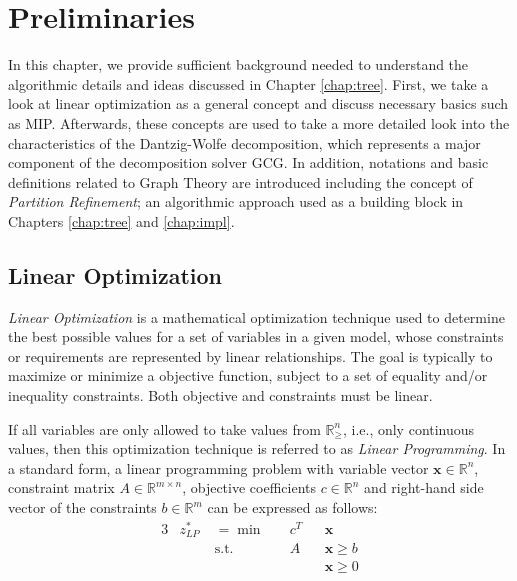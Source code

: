 \chapter{Preliminaries}

	In this chapter, we provide sufficient background needed to understand the algorithmic details and ideas discussed in Chapter \ref{chap:tree}.
	First, we take a look at linear optimization as a general concept and discuss necessary basics such as \ac{MIP}.
	Afterwards, these concepts are used to take a more detailed look into the characteristics of the Dantzig-Wolfe decomposition, which represents a major component of the decomposition solver \acs{GCG}.
	In addition, notations and basic definitions related to Graph Theory are introduced including the concept of \textit{Partition Refinement}; an algorithmic approach used as a building block in Chapters \ref{chap:tree} and \ref{chap:impl}.

	\section{Linear Optimization}
	
		\textit{Linear Optimization} is a mathematical optimization technique used to determine the best possible values for a set of variables in a given model, whose constraints or requirements are represented by linear relationships. The goal is typically to maximize or minimize a objective function, subject to a set of equality and/or inequality constraints. Both objective and constraints must be linear.
		
		If all variables are only allowed to take values from $\mathbb{R}^n_{\geq}$, i.e., only continuous values, then this optimization technique is referred to as \textit{Linear Programming}.
		In a standard form, a linear programming problem with variable vector $\mathbf{x} \in \mathbb{R}^n$, constraint matrix $A \in \mathbb{R}^{m \times n}$, objective coefficients $c \in \mathbb{R}^n$ and right-hand side vector of the constraints $b \in \mathbb{R}^m$ can be expressed as follows:
		\begin{alignat}{3}
			&z^*_{LP} \; &={}	\min	&\quad  c^T && \mathbf{x} \label{eq:prelims:linprog:obj} \\
			&				  		& \text{s.t.} & \quad A && \mathbf{x} \geq b \label{eq:prelims:linprog:A} \\
			&						&					 &					&& \mathbf{x} \geq 0 \label{eq:prelims:linprog:nonneg}
		\end{alignat}
		
